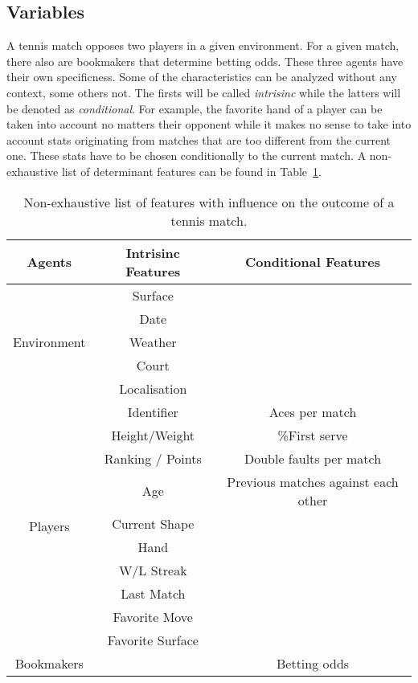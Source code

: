 \documentclass[a4paper,9pt]{report}
\theoremstyle{mytheor}
\begin{document}
\subsection{Variables}
\label{subsec:variables}
A tennis match opposes two players in a given environment.
For a given match, there also are bookmakers that determine betting odds.
These three agents have their own specificness. Some of the
characteristics can be analyzed without any context, some others not.
The firsts will be called \textit{intrisinc} while the latters
will be denoted as \textit{conditional}. For example, the favorite hand of a player
can be taken into account no matters their opponent while it makes no sense to take into account stats originating from matches
that are too different from the current one. These stats have to be chosen
conditionally to the current match.
A non-exhaustive list of determinant features can be found in Table~\ref{tab:features}.

\begin{table}
  \centering
  \begin{tabular}{|c|c|c|}
    \hline
    \textbf{Agents} & \textbf{Intrisinc Features} & \textbf{Conditional Features}\\
    \hline
    \multirow{5}{*}{Environment} & Surface & \\
      &  Date & \\
      & Weather & \\
      & Court & \\
      & Localisation &\\
      \hline
    \multirow{10}{*}{Players} & Identifier  & Aces per match \\
        &  Height/Weight  &  \%First serve \\
        & Ranking / Points & Double faults per match \\
        & Age & Previous matches against each other \\
        & Current Shape & \\
        & Hand & \\
        & W/L Streak & \\
        & Last Match & \\
        & Favorite Move & \\
        & Favorite Surface  & \\
    \hline
        Bookmakers & & Betting odds\\
    \hline
  \end{tabular}
  \caption{Non-exhaustive list of features with influence on the outcome of a tennis match.}
  \label{tab:features}
\end{table}
\end{document}
